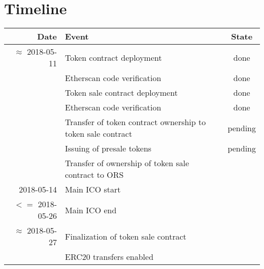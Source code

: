 \documentclass{article}
\newcommand{\ors}{{\sf ORS}}
\begin{document}
\newpage


\section{Timeline}

\begin{center}
\begin{table}[h]
\begin{tabular}{r|l|c}

Date & Event& State \\\hline
$\approx$ 2018-05-11&Token contract deployment&done \\
&Etherscan code verification&done \\
&Token sale contract deployment&done \\
&Etherscan code verification &done\\
&Transfer of token contract ownership to token sale contract&pending \\
&Issuing of presale tokens&pending\\
&Transfer of ownership of token sale contract to \ors\\
2018-05-14& Main ICO start\\
$<=$ 2018-05-26& Main ICO end\\
$\approx$ 2018-05-27& Finalization of token sale contract\\
& ERC20 transfers enabled\\

\end{tabular}
\end{table}
\end{center}
\end{document}
